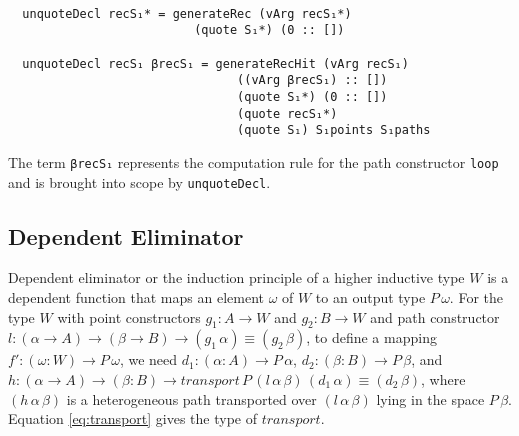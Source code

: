 \documentclass[sigplan,10pt]{acmart}
\begin{document}
\begin{center}
\begingroup
\fontsize{8pt}{9pt}\selectfont
\begin{Verbatim}

  unquoteDecl recS₁* = generateRec (vArg recS₁*)
                          (quote S₁*) (0 :: [])

  unquoteDecl recS₁ βrecS₁ = generateRecHit (vArg recS₁)
                                ((vArg βrecS₁) :: [])
                                (quote S₁*) (0 :: [])
                                (quote recS₁*)
                                (quote S₁) S₁points S₁paths

\end{Verbatim}
\endgroup
\end{center}

The term {\tt βrecS₁} represents the computation rule for the path constructor {\tt loop} and is brought into scope by {\tt unquoteDecl}.

\subsection{Dependent Eliminator}
\label{sec:sec4.3}

Dependent eliminator or the induction principle of a higher inductive type $W$ is a dependent function that maps an element $\omega$ of $W$ to an output type $P \, \omega$. For the type $W$ with point constructors $g_1 : A \rightarrow W$ and $g_2 : B \rightarrow W$ and path constructor $l : (\alpha \rightarrow A) \rightarrow (\beta \rightarrow B) \rightarrow (g_1 \, \alpha) \equiv (g_2 \, \beta)$, to define a mapping $f' : (\omega : W) \rightarrow P \, \omega$, we need $d_1 : (\alpha : A) \rightarrow P \, \alpha$, $d_2 : (\beta : B) \rightarrow P \, \beta$, and $h : (\alpha \rightarrow A) \rightarrow (\beta : B) \rightarrow transport \, P \, (l \, \alpha \, \beta) \, (d_1 \, \alpha) \equiv (d_2 \, \beta)$, where $(h \, \alpha \, \beta)$ is a heterogeneous path transported over $(l \, \alpha \, \beta)$ lying in the space $P \, \beta$. Equation \eqref{eq:transport} gives the type of $transport$.
\end{document}
